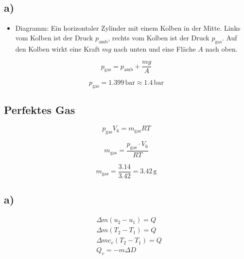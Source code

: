 

\subsection*{a)}

\begin{itemize}
    \item Diagramm: Ein horizontaler Zylinder mit einem Kolben in der Mitte. Links vom Kolben ist der Druck $p_\text{amb}$, rechts vom Kolben ist der Druck $p_\text{gas}$. Auf den Kolben wirkt eine Kraft $mg$ nach unten und eine Fläche $A$ nach oben.
\end{itemize}

\[
p_\text{gas} = p_\text{amb} + \frac{mg}{A}
\]

\[
p_\text{gas} = 1.399 \, \text{bar} \approx 1.4 \, \text{bar}
\]

\subsection*{Perfektes Gas}

\[
p_\text{gas} V_6 = m_\text{gas} RT
\]

\[
m_\text{gas} = \frac{p_\text{gas} \cdot V_6}{RT}
\]

\[
m_\text{gas} = \frac{3.14}{3.42} = 3.42 \, \text{g}
\]



\subsection*{a)}
\begin{align*}
    &\Delta m (u_2 - u_1) = Q \\
    &\Delta m (T_2 - T_1) = Q \\
    &\Delta m c_v (T_2 - T_1) = Q \\
    &Q_v = -m \Delta D
\end{align*}